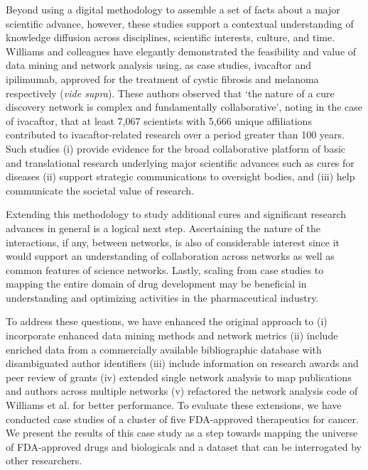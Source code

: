 \documentclass[10pt,letterpaper]{article}
\begin{document}
Beyond using a digital methodology to assemble a set of facts about a major scientific advance, however, these studies support a contextual understanding of knowledge diffusion across disciplines, scientific interests, culture, and time\cite{bibMaldame}. Williams and colleagues have elegantly demonstrated the feasibility and value of data mining and network analysis using, as case studies, ivacaftor and ipilimumab, approved for the treatment of cystic fibrosis and melanoma respectively (\textit{vide supra}). These authors observed that `the nature of a cure discovery network is complex and fundamentally collaborative', noting in the case of ivacaftor, that at least 7,067 scientists with 5,666 unique affiliations contributed to ivacaftor-related research over a period greater than 100 years. Such studies (i) provide evidence for the broad collaborative platform of basic and translational research underlying major scientific advances such as cures for diseases (ii) support strategic communications to oversight bodies, and (iii) help communicate the societal value of research\cite {bibMaldame,bibLauer}. 

Extending this methodology to study additional cures and significant research advances in general is a logical next step. Ascertaining the nature of the interactions, if any, between networks, is also of considerable interest since it would support an understanding of collaboration across networks as well as common features of science networks. Lastly, scaling from case studies to mapping the entire domain of drug development may be beneficial in understanding and optimizing activities in the pharmaceutical industry.

To address these questions, we have enhanced the original approach to (i) incorporate enhanced data mining methods and network metrics (ii) include enriched data from a commercially available bibliographic database with disambiguated author identifiers (iii) include information on research awards and peer review of grants (iv) extended single network analysis to map publications and authors across multiple networks (v) refactored the network analysis code of Williams et al. for better performance. To evaluate these extensions, we have conducted case studies of a cluster of five FDA-approved therapeutics for cancer. We present the results of this case study as a step towards mapping the universe of FDA-approved drugs and biologicals and a dataset that can be interrogated by other researchers.  
\end{document}
